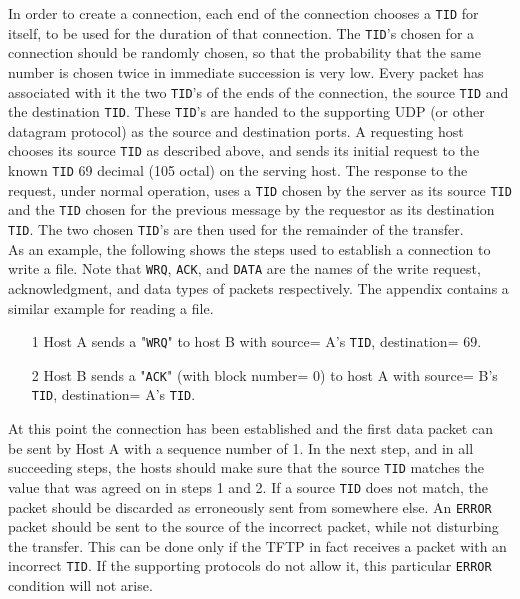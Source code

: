 \documentclass[12pt]{article}
\begin{document}
In order to create a connection, each end of the connection chooses a \verb|TID| for itself, to be used for the duration of that connection. The \verb|TID|'s chosen for a connection should be randomly chosen, so that the probability that the same number is chosen twice in immediate succession is very low.  Every packet has associated with it the two \verb|TID|'s of the ends of the connection, the source \verb|TID| and the destination \verb|TID|.  These \verb|TID|'s are handed to the supporting UDP (or
other datagram protocol) as the source and destination ports. A requesting host chooses its source \verb|TID| as described above, and sends its initial request to the known \verb|TID| 69 decimal (105 octal) on the serving host. The response to the request, under normal operation, uses a \verb|TID| chosen by the server as its source \verb|TID| and the \verb|TID| chosen for the previous message by the requestor as its destination \verb|TID|. The two chosen \verb|TID|'s are then used for the remainder of the transfer.\\

As an example, the following shows the steps used to establish a connection to write a file. Note that \verb|WRQ|, \verb|ACK|, and \verb|DATA| are the names of the write request, acknowledgment, and data types of packets respectively. The appendix contains a similar example for reading a file.
\begin{itemize}
\item[1] Host A sends  a  "\verb|WRQ|"  to  host  B  with  source=  A's  \verb|TID|, destination= 69.
\item[2] Host  B  sends  a "\verb|ACK|" (with block number= 0) to host A with source= B's \verb|TID|, destination= A's \verb|TID|.
\end{itemize}
   
At this point the connection has been established and the first data packet can be sent by Host A with a sequence number of 1. In the next step, and in all succeeding steps, the hosts should make sure that the source \verb|TID| matches the value that was agreed on in steps 1 and 2. If a source \verb|TID| does not match, the packet should be discarded as erroneously sent from somewhere else. An   \verb|ERROR| packet should be sent to the source of the incorrect packet, while not disturbing the transfer.  This can be done only if the TFTP in fact receives a packet with an incorrect \verb|TID|.  If the supporting protocols do not allow it, this particular   \verb|ERROR| condition will not arise.\\
\end{document}
